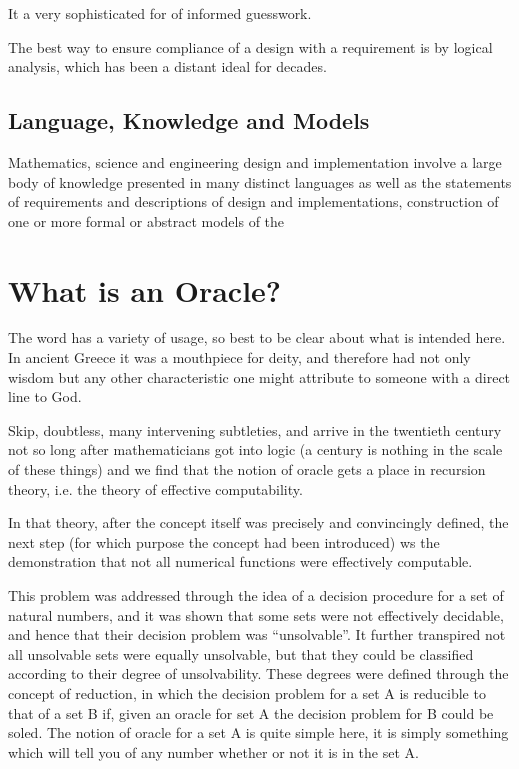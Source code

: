 \documentclass[10pt,titlepage]{book}
\begin{document}
It a very sophisticated for of informed guesswork.

The best way to ensure compliance of a design with a requirement is by logical analysis, which has been a distant ideal for decades.

\subsection{Language, Knowledge and Models}

Mathematics, science and engineering design and implementation involve a large body of knowledge presented in many distinct languages as well as the statements of requirements and descriptions of design and implementations, construction of one or more formal or abstract models of the

\section{What is an Oracle?}

The word has a variety of usage, so best to be clear about what is intended here.
In ancient Greece it was a mouthpiece for deity, and therefore had not only wisdom but any other characteristic one might attribute to someone with a direct line to God.

Skip, doubtless, many intervening subtleties, and arrive in the twentieth century not so long after mathematicians got into logic (a century is nothing in the scale of these things) and we find that the notion of oracle gets a place in recursion theory, i.e. the theory of effective computability.

In that theory, after the concept itself was precisely and convincingly defined, the next step (for which purpose the concept had been introduced) ws the demonstration that not all numerical functions were effectively computable.

This problem was addressed through the idea of a decision procedure for a set of natural numbers, and it was shown that some sets were not effectively decidable, and hence that their decision problem was ``unsolvable''.
It further transpired not all unsolvable sets were equally unsolvable, but that they could be classified according to their degree of unsolvability.
These degrees were defined through the concept of reduction, in which the decision problem for a set A is reducible to that of a set B if, given an oracle for set A the decision problem for B could be soled.
The notion of oracle for a set A is quite simple here, it is simply something which will tell you of any number whether or not it is in the set A.
\end{document}
